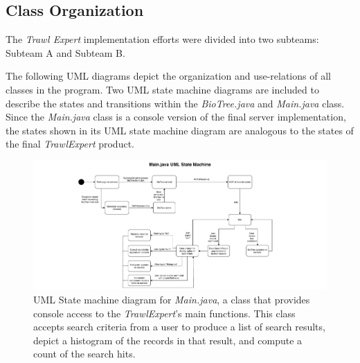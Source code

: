\documentclass{article}
\begin{document}
\subsection{Class Organization}
The \textit{Trawl Expert} implementation efforts were divided into two subteams: Subteam A and Subteam B. 

The following UML diagrams depict the organization and use-relations of all classes in the program. Two UML state machine diagrams are included to describe the states and transitions within the \textit{BioTree.java} and \textit{Main.java} class. Since the \textit{Main.java} class is a console version of the final server implementation, the states shown in its UML state machine diagram are analogous to the states of the final \textit{TrawlExpert} product.


\begin{figure}[H]
\includegraphics[width=18cm, trim={6cm 0 6cm 0}, clip]{MainDotJava.pdf}

\caption{UML State machine diagram for \textit{Main.java}, a class that provides console access to the \textit{TrawlExpert}'s main functions. This class accepts search criteria from a user to produce a list of search results, depict a histogram of the records in that result, and compute a count of the search hits.}
\label{fig:Tree}
\end{figure}
\end{document}
